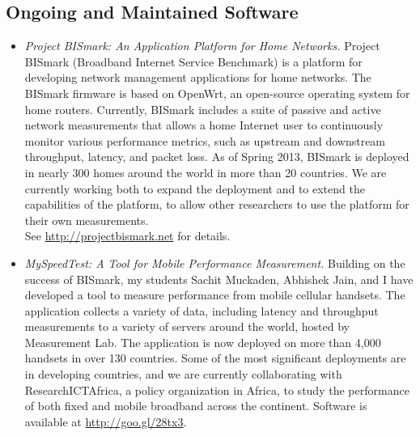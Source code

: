 \documentclass{article}
\begin{document}
\begin{cv}{}
\subsection*{Ongoing and Maintained Software}

\begin{itemize}
\item {\em Project BISmark: An Application Platform for Home Networks.}
  Project BISmark (Broadband Internet Service Benchmark) is a platform
  for developing network management applications for home networks.  The
  BISmark firmware is based on OpenWrt, an open-source operating system
  for home routers.  Currently, BISmark includes a suite of passive and
  active network measurements that allows a home Internet user to
  continuously monitor various performance metrics, such as upstream and
  downstream throughput, latency, and packet loss.  As of Spring 2013,
  BISmark is deployed in nearly 300 homes around the world in more than
  20 countries.  We are currently working both to expand the deployment
  and to extend the capabilities of the platform, to allow other
  researchers to use the platform for their own measurements.  \\ See
  \url{http://projectbismark.net} for details.

\item {\em MySpeedTest: A Tool for Mobile Performance Measurement.}
  Building on the success of BISmark, my students Sachit Muckaden,
  Abhishek Jain, and I have developed a tool to measure performance from
  mobile cellular handsets.  The application collects a variety of data,
  including latency and throughput measurements to a variety of servers
  around the world, hosted by Measurement Lab.  The application is now
  deployed on more than 4,000 handsets in over 130 countries.  Some of
  the most significant deployments are in developing countries, and we
  are currently collaborating with ResearchICTAfrica, a policy
  organization in Africa, to study the performance of both fixed and
  mobile broadband across the continent.  Software is available at
  \url{http://goo.gl/28tx3}.


\end{itemize}
\end{cv}
\end{document}
